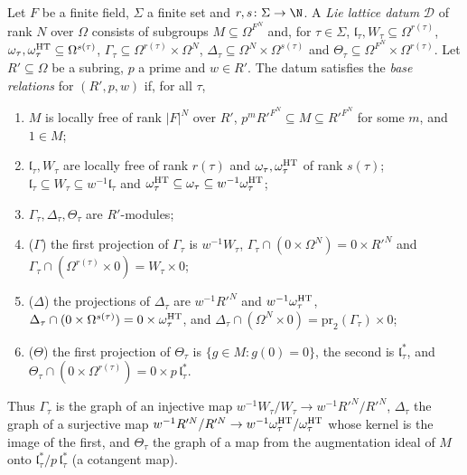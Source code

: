 \begin{definition}\label{pf:tower:def-lld}
Let $F$ be a finite field, $\Sigma$ a finite set and $r,s\colon\Sigma\to\N$. A \emph{Lie lattice datum} $\mathcal D$
of rank $N$ over $\Omega$ consists of subgroups $M\subseteq\Omega^{F^N}$ and, for $\tau\in\Sigma$,
$\mathfrak l_\tau,W_\tau\subseteq\Omega^{r(\tau)}$, $\omega_\tau,\omega^{\mathrm{HT}}_\tau\subseteq\Omega^{s(\tau)}$,
$\Gamma_\tau\subseteq\Omega^{r(\tau)}\times\Omega^N$, $\Delta_\tau\subseteq\Omega^N\times\Omega^{s(\tau)}$ and
$\Theta_\tau\subseteq\Omega^{F^N}\times\Omega^{r(\tau)}$. Let $R'\subseteq\Omega$ be a subring, $p$ a prime and
$w\in R'$. The datum satisfies the \emph{base relations} for $(R',p,w)$ if, for all $\tau$,
\begin{enumerate}[label=(B\arabic*)]
\item $M$ is locally free of rank $|F|^N$ over $R'$, $p^mR'^{F^N}\subseteq M\subseteq R'^{F^N}$ for some $m$, and
  $1\in M$;
\item $\mathfrak l_\tau,W_\tau$ are locally free of rank $r(\tau)$ and $\omega_\tau,\omega^{\mathrm{HT}}_\tau$ of
  rank $s(\tau)$; $\mathfrak l_\tau\subseteq W_\tau\subseteq w^{-1}\mathfrak l_\tau$ and
  $\omega^{\mathrm{HT}}_\tau\subseteq\omega_\tau\subseteq w^{-1}\omega^{\mathrm{HT}}_\tau$;
\item $\Gamma_\tau,\Delta_\tau,\Theta_\tau$ are $R'$-modules;
\item ($\Gamma$) the first projection of $\Gamma_\tau$ is $w^{-1}W_\tau$, $\Gamma_\tau\cap(0\times\Omega^N)=0\times R'^N$
  and $\Gamma_\tau\cap(\Omega^{r(\tau)}\times0)=W_\tau\times0$;
\item ($\Delta$) the projections of $\Delta_\tau$ are $w^{-1}R'^N$ and $w^{-1}\omega^{\mathrm{HT}}_\tau$,
  $\Delta_\tau\cap(0\times\Omega^{s(\tau)})=0\times\omega^{\mathrm{HT}}_\tau$, and
  $\Delta_\tau\cap(\Omega^N\times0)=\mathrm{pr}_2(\Gamma_\tau)\times0$;
\item ($\Theta$) the first projection of $\Theta_\tau$ is $\{g\in M:g(0)=0\}$, the second is $\mathfrak l_\tau^{*}$, and
  $\Theta_\tau\cap(0\times\Omega^{r(\tau)})=0\times p\,\mathfrak l_\tau^{*}$.
\end{enumerate}
\end{definition}

Thus $\Gamma_\tau$ is the graph of an injective map $w^{-1}W_\tau/W_\tau\to w^{-1}R'^N/R'^N$, $\Delta_\tau$ the graph of
a surjective map $w^{-1}R'^N/R'^N\to w^{-1}\omega^{\mathrm{HT}}_\tau/\omega^{\mathrm{HT}}_\tau$ whose kernel is the image of the
first, and $\Theta_\tau$ the graph of a map from the augmentation ideal of $M$ onto
$\mathfrak l_\tau^{*}/p\,\mathfrak l_\tau^{*}$ (a cotangent map).


